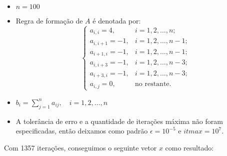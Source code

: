 	\begin{itemize}
		\item \(n = 100\)
		\item Regra de formação de \(A\) é denotada por:
		\[
			\begin{cases}
				a_{i,i} = 4,	& i = 1, 2, \ldots, n;\\
				a_{i,i+1} = -1,	& i = 1, 2, \ldots, n-1;\\
				a_{i+1,i} = -1,	& i = 1, 2, \ldots, n-1;\\
				a_{i,i+3} = -1,	& i = 1, 2, \ldots, n-3;\\
				a_{i+3,i} = -1,	& i = 1, 2, \ldots, n-3;\\
				a_{i,j} = 0,	& \mbox{no restante.}
			\end{cases}
		\]
		\item \(b_{i} = \sum_{j=1}^{n} a_{ij}, \quad i = 1, 2, \ldots, n\)
		\item A tolerância de erro e a quantidade de iterações máxima não foram especificadas,
			então deixamos como padrão \(\epsilon = 10^{-5}\) e \(itmax = 10^{7}\).
	\end{itemize}
Com 1357 iterações, conseguimos o seguinte vetor \(x\) como resultado:
